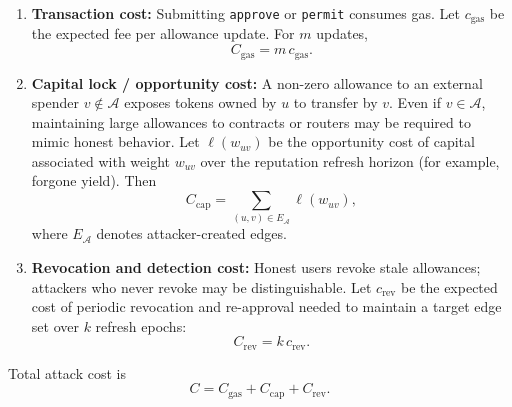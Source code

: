 \begin{enumerate}
\item \textbf{Transaction cost:} Submitting \texttt{approve} or \texttt{permit} consumes gas. Let $c_{\mathrm{gas}}$ be the expected fee per allowance update. For $m$ updates,
\begin{equation}
C_{\mathrm{gas}} = m\, c_{\mathrm{gas}}.
\end{equation}

\item \textbf{Capital lock / opportunity cost:} A non-zero allowance to an external spender $v\notin\mathcal{A}$ exposes tokens owned by $u$ to transfer by $v$. Even if $v\in\mathcal{A}$, maintaining large allowances to contracts or routers may be required to mimic honest behavior. Let $\ell(w_{uv})$ be the opportunity cost of capital associated with weight $w_{uv}$ over the reputation refresh horizon (for example, forgone yield). Then
\begin{equation}
C_{\mathrm{cap}} = \sum_{(u,v)\in E_{\mathcal{A}}} \ell(w_{uv}),
\end{equation}
where $E_{\mathcal{A}}$ denotes attacker-created edges.

\item \textbf{Revocation and detection cost:} Honest users revoke stale allowances; attackers who never revoke may be distinguishable. Let $c_{\mathrm{rev}}$ be the expected cost of periodic revocation and re-approval needed to maintain a target edge set over $k$ refresh epochs:
\begin{equation}
C_{\mathrm{rev}} = k\, c_{\mathrm{rev}}.
\end{equation}
\end{enumerate}

Total attack cost is
\begin{equation}
\label{eq:total-cost}
C = C_{\mathrm{gas}} + C_{\mathrm{cap}} + C_{\mathrm{rev}}.
\end{equation}


